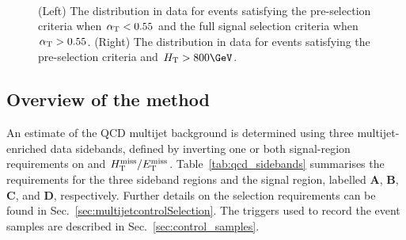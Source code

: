 \begin{figure}[!h]
 \centering
  \\
 \caption{(Left) The \alphat distribution in data for events
   satisfying the pre-selection criteria when $\alpha_{\text{T}} < 0.55$ and the
   full signal selection criteria when $\alpha_{\text{T}} > 0.55$. (Right) The
   \bdphi distribution in data for events satisfying the pre-selection
   criteria and $\scalht > 800\GeV$.   }
 \label{fig:alphat_bdphi_distr}
\end{figure}

\subsection{Overview of the method}
\label{sec:qcdMethod}

An estimate of the QCD multijet background is determined using three
multijet-enriched data sidebands, defined by inverting one or both
signal-region requirements on \bdphi and
$\mbox{$H_{\rm T}^{\rm miss}$}/\mbox{$E_\text{T}^{\rm miss}$}$. Table~\ref{tab:qcd_sidebands} summarises the requirements
for the three sideband regions and the signal region, labelled
\textbf{A}, \textbf{B}, \textbf{C}, and \textbf{D},
respectively. Further details on the selection requirements can be
found in Sec.~\ref{sec:multijetcontrolSelection}. The triggers used to
record the event samples are described in
Sec.~\ref{sec:control_samples}.

